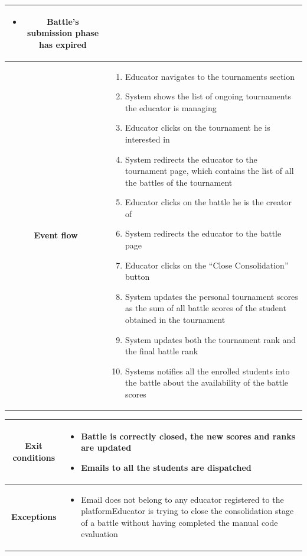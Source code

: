 \begin{center}
\begin{tabular}{ |c|m{10cm}| }
\begin{itemize}
            \item Battle's submission phase has expired
        \end{itemize} \\
        \hline
        \textbf{Event flow} &
        \begin{enumerate}
            \item Educator navigates to the tournaments section
            \item System shows the list of ongoing tournaments the educator is managing
            \item Educator clicks on the tournament he is interested in
            \item System redirects the educator to the tournament page, which contains the list of all the battles of the tournament
            \item Educator clicks on the battle he is the creator of
            \item System redirects the educator to the battle page
            \item Educator clicks on the “Close Consolidation” button
            \item System updates the personal tournament scores as the sum of all battle scores of the student obtained in the tournament
            \item System updates both the tournament rank and the final battle rank
            \item Systems notifies all the enrolled students into the battle about the availability of the battle scores
        \end{enumerate} \\
        \hline
    \end{tabular}
    \newpage
    \begin{tabular}{ |c|m{10cm}| }
        \hline
        \textbf{Exit conditions} &
        \begin{itemize}
            \item Battle is correctly closed, the new scores and ranks are updated
            \item Emails to all the students are dispatched
        \end{itemize} \\
        \hline
        \textbf{Exceptions} & 
        \begin{itemize}
            \item Email does not belong to any educator registered to the platformEducator is trying to close the consolidation stage of a battle without having completed the manual code evaluation

\end{itemize}
\end{tabular}
\end{center}
